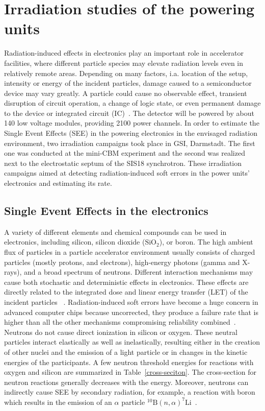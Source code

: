 \newpage
\section{Irradiation studies of the powering units}
Radiation-induced effects in electronics play an important role in accelerator facilities, where different particle species may elevate radiation levels even in relatively remote areas. Depending on many factors, i.a. location of the setup, intensity or energy of the incident particles, damage caused to a semiconductor device may vary greatly. A particle could cause no observable effect, transient disruption of circuit operation, a change of logic state, or even permanent damage to the device or integrated circuit (IC)~\cite{dodd}. The detector will be powered by about 140 low voltage modules, providing 2100 power channels. In order to estimate the Single Event Effects (SEE) in the powering electronics in the envisaged radiation environment, two irradiation campaigns took place in GSI, Darmstadt.  The first one was conducted at the mini-CBM experiment and the second was realized next to the electrostatic septum of the SIS18 synchrotron. These irradiation campaigns aimed at detecting radiation-induced soft errors in the power units' electronics and estimating its rate.


\subsection{Single Event Effects in the electronics}
A variety of different elements and chemical compounds can be used in electronics, including silicon, silicon dioxide ($\mathrm{SiO}_{2}$), or boron. The high ambient flux of particles in a particle accelerator environment usually consists of charged particles (mostly protons, and electrons), high-energy photons (gamma and X-rays), and a broad spectrum of neutrons. Different interaction mechanisms may cause both stochastic and deterministic effects in electronics. These effects are directly related to the integrated dose and linear energy transfer (\gls{LET}) of the incident particles ~\cite{electronic_system_on_module}. Radiation-induced soft errors have become a huge concern in advanced computer chips because uncorrected, they produce a failure rate that is higher than all the other mechanisms compromising reliability combined~\cite{1545891}. Neutrons do not cause direct ionization in silicon or oxygen. These neutral particles interact elastically as well as inelastically, resulting either in the creation of other nuclei and the emission of a light particle or in changes in the kinetic energies of the participants. A few neutron threshold energies for reactions with oxygen and silicon are summarized in Table~\ref{cross-seciton}. The cross-section for neutron reactions generally decreases with the energy. Moreover, neutrons can indirectly cause SEE by secondary radiation, for example, a reaction with boron which results in the emission of an $\alpha$ particle $^{10}\mathrm{B}(n,\alpha)^{7}\mathrm{Li}$~\cite{1545891,neutrons_energy,neutrons_energy_2}. 

